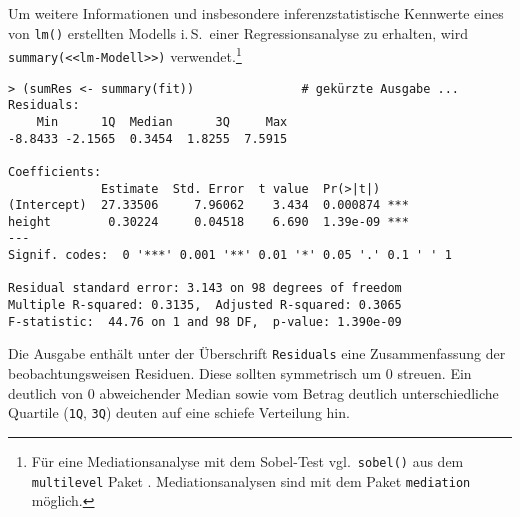Um weitere Informationen und insbesondere inferenzstatistische Kennwerte eines von \lstinline!lm()! erstellten Modells i.\,S.\ einer Regressionsanalyse zu erhalten, wird \lstinline!summary(<<lm-Modell>>)! verwendet.\footnote{Für eine Mediationsanalyse mit dem Sobel-Test vgl.\ \lstinline!sobel()! aus dem \lstinline!multilevel! Paket \cite{Bliese2006}. Mediationsanalysen sind mit dem Paket \lstinline!mediation! \cite{Tingley2011} möglich.}
\begin{lstlisting}
> (sumRes <- summary(fit))               # gekürzte Ausgabe ...
Residuals:
    Min      1Q  Median      3Q     Max
-8.8433 -2.1565  0.3454  1.8255  7.5915

Coefficients:
             Estimate  Std. Error  t value  Pr(>|t|)
(Intercept)  27.33506     7.96062    3.434  0.000874 ***
height        0.30224     0.04518    6.690  1.39e-09 ***
---
Signif. codes:  0 '***' 0.001 '**' 0.01 '*' 0.05 '.' 0.1 ' ' 1

Residual standard error: 3.143 on 98 degrees of freedom
Multiple R-squared: 0.3135,  Adjusted R-squared: 0.3065
F-statistic:  44.76 on 1 and 98 DF,  p-value: 1.390e-09
\end{lstlisting}

Die Ausgabe enthält unter der Überschrift \lstinline!Residuals! eine Zusammenfassung der beobachtungsweisen Residuen. Diese sollten symmetrisch um 0 streuen. Ein deutlich von 0 abweichender Median sowie vom Betrag deutlich unterschiedliche Quartile (\lstinline!1Q!, \lstinline!3Q!) deuten auf eine schiefe Verteilung hin.

